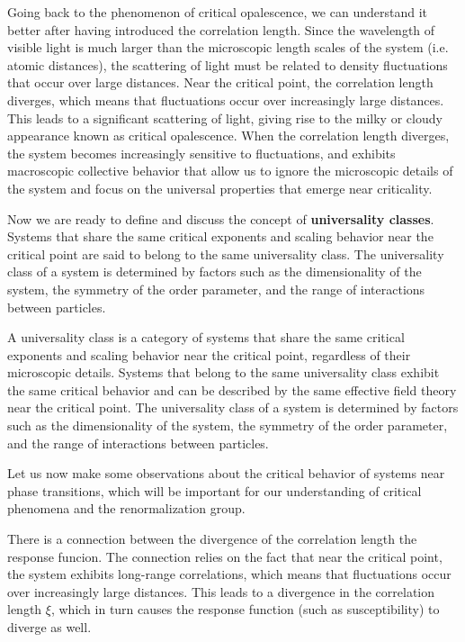 \begin{remark}
    Going back to the phenomenon of critical opalescence, we can understand it better after having introduced the correlation length. Since the wavelength of visible light is much larger than the microscopic length scales of the system (i.e. atomic distances), the scattering of light must be related to density fluctuations that occur over large distances. Near the critical point, the correlation length diverges, which means that fluctuations occur over increasingly large distances. This leads to a significant scattering of light, giving rise to the milky or cloudy appearance known as critical opalescence. When the correlation length diverges, the system becomes increasingly sensitive to fluctuations, and exhibits macroscopic collective behavior that allow us to ignore the microscopic details of the system and focus on the universal properties that emerge near criticality.
\end{remark}

Now we are ready to define and discuss the concept of \textbf{universality classes}. Systems that share the same critical exponents and scaling behavior near the critical point are said to belong to the same universality class. The universality class of a system is determined by factors such as the dimensionality of the system, the symmetry of the order parameter, and the range of interactions between particles.

\begin{definition}
    A universality class is a category of systems that share the same critical exponents and scaling behavior near the critical point, regardless of their microscopic details. Systems that belong to the same universality class exhibit the same critical behavior and can be described by the same effective field theory near the critical point. The universality class of a system is determined by factors such as the dimensionality of the system, the symmetry of the order parameter, and the range of interactions between particles.
\end{definition}

Let us now make some observations about the critical behavior of systems near phase transitions, which will be important for our understanding of critical phenomena and the renormalization group.

\begin{remark}
    There is a connection between the divergence of the correlation length the response funcion. 
    The connection relies on the fact that near the critical point, the system exhibits long-range correlations, which means that fluctuations occur over increasingly large distances. This leads to a divergence in the correlation length \(\xi\), which in turn causes the response function (such as susceptibility) to diverge as well.
\end{remark}

